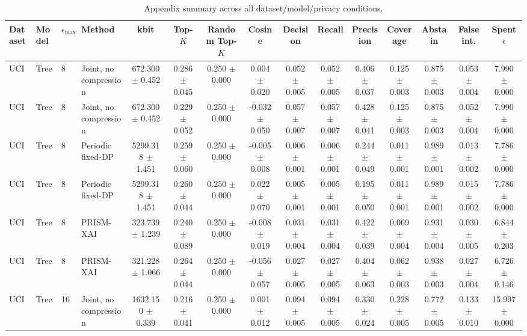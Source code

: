 \begin{table}[t]
\caption{Appendix summary across all dataset/model/privacy conditions.}
\label{tab:appendix-conditions}
\centering
\scriptsize
\setlength{\tabcolsep}{2.5pt}
\begin{tabular}{llllccccccccccc}
\toprule
Dataset & Model & $\epsilon_{\max}$ & Method & kbit & Top-$K$ & Random Top-$K$ & Cosine & Decision & Recall & Precision & Coverage & Abstain & False int. & Spent $\epsilon$ \\
\midrule
UCI & Tree & 8 & Joint, no compression & 672.300 $\pm$ 0.452 & 0.286 $\pm$ 0.045 & 0.250 $\pm$ 0.000 & 0.004 $\pm$ 0.020 & 0.052 $\pm$ 0.005 & 0.052 $\pm$ 0.005 & 0.406 $\pm$ 0.037 & 0.125 $\pm$ 0.003 & 0.875 $\pm$ 0.003 & 0.053 $\pm$ 0.004 & 7.990 $\pm$ 0.000 \\
UCI & Tree & 8 & Joint, no compression & 672.300 $\pm$ 0.452 & 0.229 $\pm$ 0.052 & 0.250 $\pm$ 0.000 & -0.032 $\pm$ 0.050 & 0.057 $\pm$ 0.007 & 0.057 $\pm$ 0.007 & 0.428 $\pm$ 0.041 & 0.125 $\pm$ 0.003 & 0.875 $\pm$ 0.003 & 0.052 $\pm$ 0.004 & 7.990 $\pm$ 0.000 \\
UCI & Tree & 8 & Periodic fixed-DP & 5299.318 $\pm$ 1.451 & 0.259 $\pm$ 0.060 & 0.250 $\pm$ 0.000 & -0.005 $\pm$ 0.008 & 0.006 $\pm$ 0.001 & 0.006 $\pm$ 0.001 & 0.244 $\pm$ 0.049 & 0.011 $\pm$ 0.001 & 0.989 $\pm$ 0.001 & 0.013 $\pm$ 0.002 & 7.786 $\pm$ 0.000 \\
UCI & Tree & 8 & Periodic fixed-DP & 5299.318 $\pm$ 1.451 & 0.260 $\pm$ 0.044 & 0.250 $\pm$ 0.000 & 0.022 $\pm$ 0.070 & 0.005 $\pm$ 0.001 & 0.005 $\pm$ 0.001 & 0.195 $\pm$ 0.050 & 0.011 $\pm$ 0.001 & 0.989 $\pm$ 0.001 & 0.015 $\pm$ 0.002 & 7.786 $\pm$ 0.000 \\
UCI & Tree & 8 & PRISM-XAI & 323.739 $\pm$ 1.239 & 0.240 $\pm$ 0.089 & 0.250 $\pm$ 0.000 & -0.008 $\pm$ 0.019 & 0.031 $\pm$ 0.004 & 0.031 $\pm$ 0.004 & 0.422 $\pm$ 0.039 & 0.069 $\pm$ 0.004 & 0.931 $\pm$ 0.004 & 0.030 $\pm$ 0.005 & 6.844 $\pm$ 0.203 \\
UCI & Tree & 8 & PRISM-XAI & 321.228 $\pm$ 1.066 & 0.264 $\pm$ 0.044 & 0.250 $\pm$ 0.000 & -0.056 $\pm$ 0.057 & 0.027 $\pm$ 0.005 & 0.027 $\pm$ 0.005 & 0.404 $\pm$ 0.063 & 0.062 $\pm$ 0.003 & 0.938 $\pm$ 0.003 & 0.027 $\pm$ 0.004 & 6.726 $\pm$ 0.146 \\
UCI & Tree & 16 & Joint, no compression & 1632.150 $\pm$ 0.339 & 0.216 $\pm$ 0.041 & 0.250 $\pm$ 0.000 & 0.001 $\pm$ 0.012 & 0.094 $\pm$ 0.005 & 0.094 $\pm$ 0.005 & 0.330 $\pm$ 0.024 & 0.228 $\pm$ 0.005 & 0.772 $\pm$ 0.005 & 0.133 $\pm$ 0.010 & 15.997 $\pm$ 0.000 \\

\end{tabular}
\end{table}
